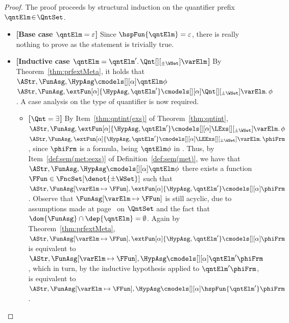 \documentclass[authoryear]{elsarticle}
\begin{document}
\thmhst*
%
\begin{proof}
  The proof proceeds by structural induction on the quantifier prefix $\qntElm
  \!\in\! \QntSet$.
  \begin{itemize}[$\bullet$]
    \item\textbf{[Base case $\qntElm = \varepsilon$]}
      Since $\hspFun{\qntElm} = \varepsilon$, there is really nothing to prove
      as the statement is trivially true.
    \item\textbf{[Inductive case $\qntElm = \qntElm' \ldotp \Qnt[][_{\pm\WSet}]
      \varElm$]}
      By Theorem~\ref{thm:prfextMeta}, it holds that
      $\AStr, \FunAsg, \HypAsg \cmodels[][\alpha] \qntElm \phi$ \iff $\AStr,
      \FunAsg, \extFun[\alpha]{\HypAsg, \qntElm'} \cmodels[][\alpha]
      \Qnt[][_{\pm\WSet}] \varElm \ldotp \phi$.
      A case analysis on the type of quantifier is now required.
      \begin{itemize}[$\bullet$]
        \item\textbf{[$\Qnt = \exists$]}
          By Item~\ref{thm:qntint(exs)} of Theorem~\ref{thm:qntint}, $\AStr,
          \FunAsg, \extFun[\alpha]{\HypAsg, \qntElm'} \cmodels[][\alpha]
          \LExs[][_{\pm\WSet}] \varElm \ldotp \phi$ \iff $\AStr, \FunAsg,
          \allowbreak \extFun[\alpha]{\HypAsg, \qntElm'} \cmodels[][\alpha]
          \LEExs[][_{\pm\WSet}] \varElm \ldotp \phiFrm$, since $\phiFrm$ is
          a \FOL formula, being $\qntElm \phi$ in \pnf.
          Thus, by Item~\ref{def:sem(met:eexs)} of
          Definition~\ref{def:sem(met)}, we have that $\AStr, \FunAsg, \HypAsg
          \cmodels[][\alpha] \qntElm \phi$ \iff there exists a function $\FFun
          \in \FncSet[\denot{\pm\WSet}]{}$ such that $\AStr, {\FunAsg}[\varElm
          \mapsto \FFun], \extFun[\alpha]{\HypAsg, \qntElm'} \cmodels[][\alpha]
          \phiFrm$.
          Observe that ${\FunAsg}[\varElm \mapsto \FFun]$ is still acyclic, due
          to assumptions made at page~\pageref{pag:Qassumption} on $\QntSet$
          and the fact that $\dom{\FunAsg} \cap \dep{\qntElm} = \emptyset$.
          Again by Theorem~\ref{thm:prfextMeta}, $\AStr, {\FunAsg}[\varElm
          \mapsto \FFun], \extFun[\alpha]{\HypAsg, \qntElm'} \cmodels[][\alpha]
          \phiFrm$ is equivalent to $\AStr, {\FunAsg}[\varElm \mapsto \FFun],
          \HypAsg \cmodels[][\alpha] \qntElm' \phiFrm$, which in turn, by the
          inductive hypothesis applied to $\qntElm' \phiFrm$, is equivalent to
          $\AStr, {\FunAsg}[\varElm \mapsto \FFun], \HypAsg \cmodels[][\alpha]
          \hspFun{\qntElm'} \phiFrm$.

\end{itemize}
\end{itemize}
\end{proof}
\end{document}
